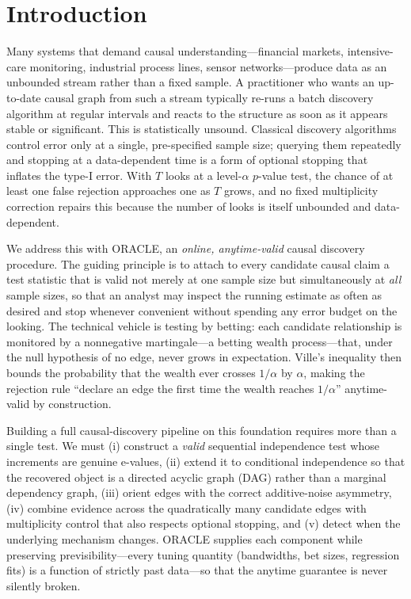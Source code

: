 \documentclass[preprint,12pt,authoryear]{elsarticle}
\begin{document}

\section{Introduction}
\label{sec:intro}
Many systems that demand causal understanding---financial markets, intensive-care
monitoring, industrial process lines, sensor networks---produce data as an
unbounded stream rather than a fixed sample. A practitioner who wants an
up-to-date causal graph from such a stream typically re-runs a batch discovery
algorithm at regular intervals and reacts to the structure as soon as it appears
stable or significant. This is statistically unsound. Classical discovery
algorithms control error only at a single, pre-specified sample size; querying
them repeatedly and stopping at a data-dependent time is a form of optional
stopping that inflates the type-I error. With $T$ looks at a level-$\alpha$
$p$-value test, the chance of at least one false rejection approaches one as
$T$ grows, and no fixed multiplicity correction repairs this because the number
of looks is itself unbounded and data-dependent.

We address this with ORACLE, an \emph{online, anytime-valid} causal discovery
procedure. The guiding principle is to attach to every candidate causal claim a
test statistic that is valid not merely at one sample size but simultaneously at
\emph{all} sample sizes, so that an analyst may inspect the running estimate as
often as desired and stop whenever convenient without spending any error budget
on the looking. The technical vehicle is testing by betting: each candidate
relationship is monitored by a nonnegative martingale---a betting wealth
process---that, under the null hypothesis of no edge, never grows in
expectation. Ville's inequality then bounds the probability that the wealth ever
crosses $1/\alpha$ by $\alpha$, making the rejection rule ``declare an edge the
first time the wealth reaches $1/\alpha$'' anytime-valid by construction.

Building a full causal-discovery pipeline on this foundation requires more than a
single test. We must (i) construct a \emph{valid} sequential independence test
whose increments are genuine e-values, (ii) extend it to conditional
independence so that the recovered object is a directed acyclic graph (DAG)
rather than a marginal dependency graph, (iii) orient edges with the correct
additive-noise asymmetry, (iv) combine evidence across the quadratically many
candidate edges with multiplicity control that also respects optional stopping,
and (v) detect when the underlying mechanism changes. ORACLE supplies each
component while preserving previsibility---every tuning quantity (bandwidths,
bet sizes, regression fits) is a function of strictly past data---so that the
anytime guarantee is never silently broken.
\end{document}
